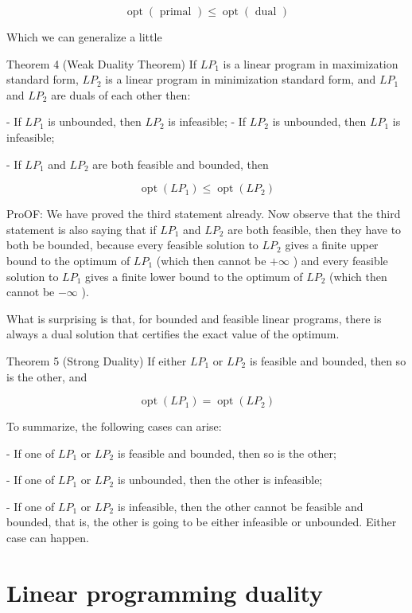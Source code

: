 $$
\operatorname{opt}(\text { primal }) \leq \operatorname{opt}(\text { dual })
$$

Which we can generalize a little

Theorem 4 (Weak Duality Theorem) If $L P_{1}$ is a linear program in maximization standard form, $L P_{2}$ is a linear program in minimization standard form, and $L P_{1}$ and $L P_{2}$ are duals of each other then:

- If $L P_{1}$ is unbounded, then $L P_{2}$ is infeasible; - If $L P_{2}$ is unbounded, then $L P_{1}$ is infeasible;

- If $L P_{1}$ and $L P_{2}$ are both feasible and bounded, then

$$
\operatorname{opt}\left(L P_{1}\right) \leq \operatorname{opt}\left(L P_{2}\right)
$$

ProOF: We have proved the third statement already. Now observe that the third statement is also saying that if $L P_{1}$ and $L P_{2}$ are both feasible, then they have to both be bounded, because every feasible solution to $L P_{2}$ gives a finite upper bound to the optimum of $L P_{1}$ (which then cannot be $+\infty$ ) and every feasible solution to $L P_{1}$ gives a finite lower bound to the optimum of $L P_{2}$ (which then cannot be $-\infty$ ).

What is surprising is that, for bounded and feasible linear programs, there is always a dual solution that certifies the exact value of the optimum.

Theorem 5 (Strong Duality) If either $L P_{1}$ or $L P_{2}$ is feasible and bounded, then so is the other, and

$$
\operatorname{opt}\left(L P_{1}\right)=\operatorname{opt}\left(L P_{2}\right)
$$

To summarize, the following cases can arise:

- If one of $L P_{1}$ or $L P_{2}$ is feasible and bounded, then so is the other;

- If one of $L P_{1}$ or $L P_{2}$ is unbounded, then the other is infeasible;

- If one of $L P_{1}$ or $L P_{2}$ is infeasible, then the other cannot be feasible and bounded, that is, the other is going to be either infeasible or unbounded. Either case can happen.

\section{Linear programming duality}\label{linear-programming-duality}

